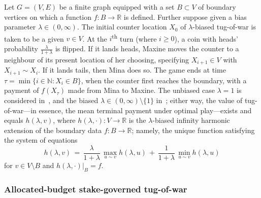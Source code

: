 \documentclass[letterpaper,11pt,oneside,reqno]{amsbook}
\newcommand{\N}{\ensuremath{\mathbb{N}}}
\newcommand{\R}{\ensuremath{\mathbb{R}}}
\numberwithin{figure}{chapter}
\theoremstyle{definition}
\theoremstyle{definition}
\theoremstyle{definition}
\theoremstyle{definition}
\theoremstyle{definition}
\begin{document}
Let $G = (V,E)$ be a finite graph equipped with a set $B \subset V$ of boundary vertices on which a function $f:B \to \R$ is defined. Further suppose given a bias parameter $\lambda \in (0,\infty)$. The initial counter location $X_0$ of $\lambda$-biased tug-of-war is taken to be a given $v \in V$. At the $i$\textsuperscript{th} turn (where $i \geq 0$), a coin with heads' probability $\tfrac{\lambda}{1 + \lambda}$  is flipped. If it lands heads, Maxine moves the counter to a neighbour of its present location of her choosing, specifying $X_{i+1} \in V$ with $X_{i+1} \sim X_i$. If it lands tails, then Mina does so. The game ends at time $\tau = \min \{ i \in \N: X_i \in B \}$, when the counter first reaches the boundary, with a payment of $f(X_\tau)$ made from Mina to Maxine. The unbiased case $\lambda =1$ is considered in~\cite{PSSW09}, and the biased $\lambda \in (0,\infty) \setminus \{1 \}$ in~\cite{PPS10}; either way,  
 the value of tug-of-war---in essence, the mean terminal payment under optimal play---exists and equals $h(\lambda,v)$, where $h(\lambda,\cdot):V \to \R$ is the $\lambda$-biased infinity harmonic extension of the boundary data $f:B \to \R$; namely, the unique function satisfying the system of equations
\begin{equation}\label{e.lambdainftylap}
 h(\lambda,v) \, = \, \frac{\lambda}{1+\lambda} \,  \max_{u \sim v} h(\lambda,u)  \, + \,  \frac{1}{1+\lambda} \, \min_{u \sim v} h(\lambda,u) 
\end{equation}
for $v \in V \setminus B$ and $h(\lambda,\cdot) \big\vert_B = f$.



\medskip

\subsubsection{Allocated-budget stake-governed tug-of-war}\label{s.allocatedbudget}
\end{document}
